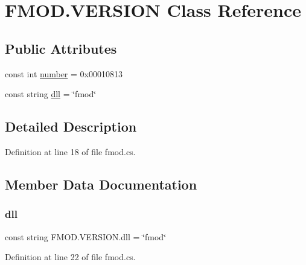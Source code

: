 \hypertarget{class_f_m_o_d_1_1_v_e_r_s_i_o_n}{}\section{F\+M\+O\+D.\+V\+E\+R\+S\+I\+ON Class Reference}
\label{class_f_m_o_d_1_1_v_e_r_s_i_o_n}
\subsection*{Public Attributes}
\begin{DoxyCompactItemize}
\item 
const int \hyperlink{class_f_m_o_d_1_1_v_e_r_s_i_o_n_aac7b2d2aa2940a1bdde7ade4090cf784}{number} = 0x00010813
\item 
const string \hyperlink{class_f_m_o_d_1_1_v_e_r_s_i_o_n_aac10add353548a83e7145584cfc3213d}{dll} = \char`\"{}fmod\char`\"{}
\end{DoxyCompactItemize}


\subsection{Detailed Description}


Definition at line 18 of file fmod.\+cs.



\subsection{Member Data Documentation}
\mbox{\label{class_f_m_o_d_1_1_v_e_r_s_i_o_n_aac10add353548a83e7145584cfc3213d}} 
\subsubsection{\texorpdfstring{dll}{dll}}
{\footnotesize\ttfamily const string F\+M\+O\+D.\+V\+E\+R\+S\+I\+O\+N.\+dll = \char`\"{}fmod\char`\"{}}



Definition at line 22 of file fmod.\+cs.

\mbox{\label{class_f_m_o_d_1_1_v_e_r_s_i_o_n_aac7b2d2aa2940a1bdde7ade4090cf784}} 
